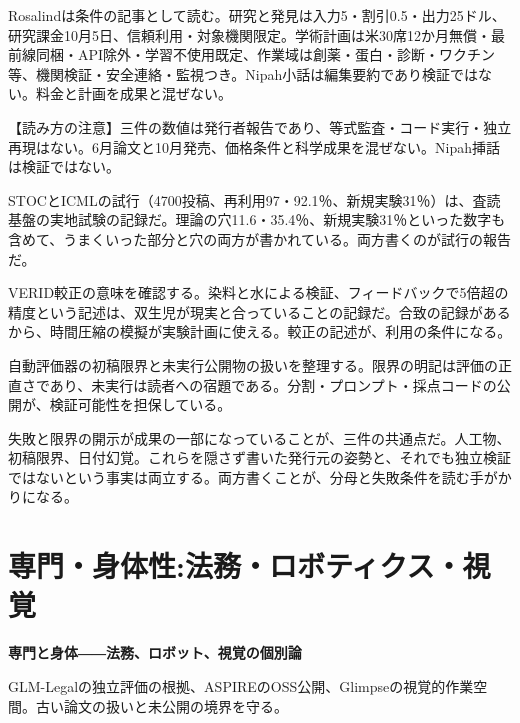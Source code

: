 \documentclass[lualatex,a4paper,10pt]{jlreq}
\begin{document}
Rosalindは条件の記事として読む。研究と発見は入力5・割引0.5・出力25ドル、研究課金10月5日、信頼利用・対象機関限定。学術計画は米30席12か月無償・最前線同梱・API除外・学習不使用既定、作業域は創薬・蛋白・診断・ワクチン等、機関検証・安全連絡・監視つき。Nipah小話は編集要約であり検証ではない。料金と計画を成果と混ぜない。
\cite{B51,B52,B86,B87}


\begin{tcolorbox}[colback=SurveySoft,colframe=SurveyRule,arc=1mm,boxrule=0.4pt,left=2mm,right=2mm]
【読み方の注意】三件の数値は発行者報告であり、等式監査・コード実行・独立再現はない。6月論文と10月発売、価格条件と科学成果を混ぜない。Nipah挿話は検証ではない。
\end{tcolorbox}
\cite{B46,B83,B44,B43,B45,B47,B84,B48,B50,B85,B49,B51,B86,B52,B87}

STOCとICMLの試行（4700投稿、再利用97・92.1％、新規実験31％）は、査読基盤の実地試験の記録だ。理論の穴11.6・35.4％、新規実験31％といった数字も含めて、うまくいった部分と穴の両方が書かれている。両方書くのが試行の報告だ。
\cite{B50,B85,B49}


VERID較正の意味を確認する。染料と水による検証、フィードバックで5倍超の精度という記述は、双生児が現実と合っていることの記録だ。合致の記録があるから、時間圧縮の模擬が実験計画に使える。較正の記述が、利用の条件になる。
\cite{B46,B83,B44,B43,B45}


自動評価器の初稿限界と未実行公開物の扱いを整理する。限界の明記は評価の正直さであり、未実行は読者への宿題である。分割・プロンプト・採点コードの公開が、検証可能性を担保している。
\cite{B47,B84,B48}


失敗と限界の開示が成果の一部になっていることが、三件の共通点だ。人工物、初稿限界、日付幻覚。これらを隠さず書いた発行元の姿勢と、それでも独立検証ではないという事実は両立する。両方書くことが、分母と失敗条件を読む手がかりになる。
\cite{B46,B83,B44,B43,B45,B47,B84,B48,B50,B85,B49}


\FloatBarrier %
\section{専門・身体性:法務・ロボティクス・視覚}
\label{sec:P7}

{\Large\bfseries 専門と身体――法務、ロボット、視覚の個別論\par}
\smallskip
{\color{SurveyMuted}GLM-Legalの独立評価の根拠、ASPIREのOSS公開、Glimpseの視覚的作業空間。古い論文の扱いと未公開の境界を守る。\par}
\bigskip
\end{document}
